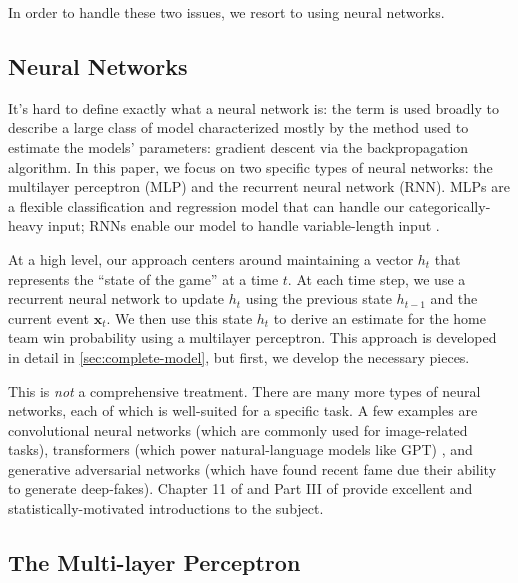 In order to handle these two issues, we resort to using neural networks.

\subsection{Neural Networks}

It's hard to define exactly what a neural network is: the term is used broadly to describe a large class of model characterized mostly by the method used to estimate the models' parameters: gradient descent via the backpropagation algorithm. In this paper, we focus on two specific types of neural networks: the multilayer perceptron (MLP) and the recurrent neural network (RNN). MLPs are a flexible classification and regression model that can handle our categorically-heavy input; RNNs enable our model to handle variable-length input \cite{PML}.

At a high level, our approach centers around maintaining a vector $h_t$ that represents the ``state of the game'' at a time $t$. At each time step, we use a recurrent neural network to update $h_t$ using the previous state $h_{t-1}$ and the current event $\mathbf x_t$. We then use this state $h_t$ to derive an estimate for the home team win probability using a multilayer perceptron. This approach is developed in detail in \autoref{sec:complete-model}, but first, we develop the necessary pieces.


This is \emph{not} a comprehensive treatment. There are many more types of neural networks, each of which is well-suited for a specific task. A few examples are convolutional neural networks (which are commonly used for image-related tasks), transformers (which power natural-language models like GPT) \cite{attention-is-all-you-need}, and generative adversarial networks (which have found recent fame due their ability to generate deep-fakes). Chapter 11 of \textcite{ESL} and Part III of \textcite{PML} provide excellent and statistically-motivated introductions to the subject.

\subsection{The Multi-layer Perceptron}

